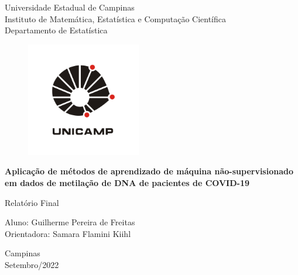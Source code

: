 \begin{titlepage}
    \begin{center}
        \vspace*{1cm}
        
        \LARGE
        Universidade Estadual de Campinas\\
        
        \large
        Instituto de Matemática, Estatística e Computação Científica\\
        Departamento de Estatística
        
        \vspace{0.5cm}

            
        \begin{figure}
		    \centering
		    \includegraphics[width=5cm]{unicamp-logo-0.png}\\
	    \end{figure}   
        
        \vspace{0.5cm}
        
        \Large
        \textbf{Aplicação de métodos de aprendizado de máquina não-supervisionado em dados de metilação de DNA de pacientes de COVID-19}
        
        \vspace{0.5cm}
        
        \large
        Relatório Final
        
        \vspace{2cm}
        
        \Large
        Aluno: Guilherme Pereira de Freitas\\
        Orientadora: Samara Flamini Kiihl
        
            
        \vfill
        
        \small
        Campinas\\
        Setembro/2022
            
        \vspace{0.8cm}
            

            
    \end{center}
\end{titlepage}
